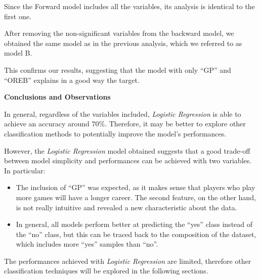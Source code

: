 Since the Forward model includes all the variables, its analysis is identical to the first one.

After removing the non-significant variables from the backward model, we obtained the same model as in the previous analysis, which we referred to as model B. 

This confirms our results, suggesting that the model with only ``GP'' and ``OREB'' explains in a good way the target. 

\vspace{0.2cm}
\textbf{Conclusions and Observations}

In general, regardless of the variables included, \textit{Logistic Regression} is able to achieve an accuracy around $70\%$. Therefore, it may be better to explore other classification methods to potentially improve the model's performances.

However, the \textit{Logistic Regression} model obtained suggests that a good trade-off between model simplicity and performances can be achieved with two variables. In particular:

\begin{itemize}
	\item The inclusion of ``GP'' was expected, as it makes sense that players who play more games will have a longer career. The second feature, on the other hand, is not really intuitive and revealed a new characteristic about the data.
	\item In general, all models perform better at predicting the ``yes'' class instead of the ``no'' class, but this can be traced back to the composition of the dataset, which includes more ``yes'' samples than ``no''.
\end{itemize}

The performances achieved with \textit{Logistic Regression} are limited, therefore other classification techniques will be explored in the following sections.
